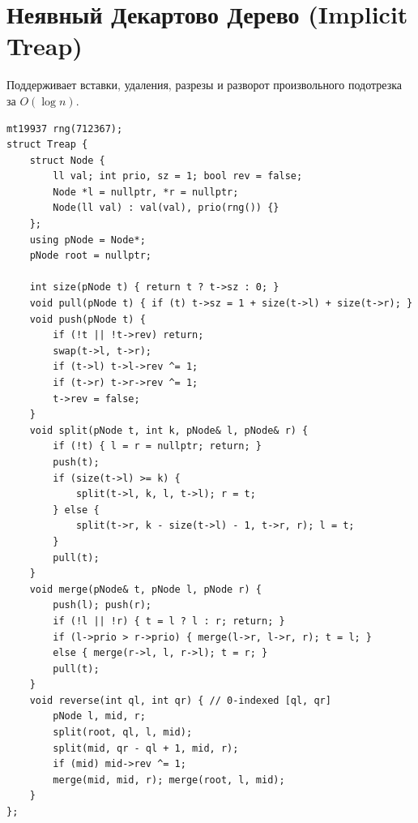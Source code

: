 \section{Неявный Декартово Дерево (Implicit Treap)}
Поддерживает вставки, удаления, разрезы и разворот произвольного подотрезка за $O(\log n)$.
\begin{lstlisting}[name=implicit_treap]
mt19937 rng(712367);
struct Treap {
    struct Node {
        ll val; int prio, sz = 1; bool rev = false;
        Node *l = nullptr, *r = nullptr;
        Node(ll val) : val(val), prio(rng()) {}
    };
    using pNode = Node*;
    pNode root = nullptr;

    int size(pNode t) { return t ? t->sz : 0; }
    void pull(pNode t) { if (t) t->sz = 1 + size(t->l) + size(t->r); }
    void push(pNode t) {
        if (!t || !t->rev) return;
        swap(t->l, t->r);
        if (t->l) t->l->rev ^= 1;
        if (t->r) t->r->rev ^= 1;
        t->rev = false;
    }
    void split(pNode t, int k, pNode& l, pNode& r) {
        if (!t) { l = r = nullptr; return; }
        push(t);
        if (size(t->l) >= k) {
            split(t->l, k, l, t->l); r = t;
        } else {
            split(t->r, k - size(t->l) - 1, t->r, r); l = t;
        }
        pull(t);
    }
    void merge(pNode& t, pNode l, pNode r) {
        push(l); push(r);
        if (!l || !r) { t = l ? l : r; return; }
        if (l->prio > r->prio) { merge(l->r, l->r, r); t = l; }
        else { merge(r->l, l, r->l); t = r; }
        pull(t);
    }
    void reverse(int ql, int qr) { // 0-indexed [ql, qr]
        pNode l, mid, r;
        split(root, ql, l, mid);
        split(mid, qr - ql + 1, mid, r);
        if (mid) mid->rev ^= 1;
        merge(mid, mid, r); merge(root, l, mid);
    }
};
\end{lstlisting}

